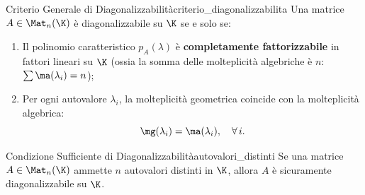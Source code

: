 \begin{teorema}{Criterio Generale di Diagonalizzabilità}{criterio_diagonalizzabilita}
Una matrice $A \in \Mat_n(\K)$ è diagonalizzabile su $\K$ se e solo se:
\begin{enumerate}
    \item Il polinomio caratteristico $p_A(\lambda)$ è \textbf{completamente fattorizzabile} in fattori lineari su $\K$ (ossia la somma delle molteplicità algebriche è $n$: $\sum \ma(\lambda_i) = n$);
    \item Per ogni autovalore $\lambda_i$, la molteplicità geometrica coincide con la molteplicità algebrica:
    \begin{equation}
        \mg(\lambda_i) = \ma(\lambda_i), \quad \forall\, i.
    \end{equation}
\end{enumerate}
\end{teorema}

\begin{corollario}{Condizione Sufficiente di Diagonalizzabilità}{autovalori_distinti}
Se una matrice $A \in \Mat_n(\K)$ ammette $n$ autovalori distinti in $\K$, allora $A$ è sicuramente diagonalizzabile su $\K$.
\end{corollario}
